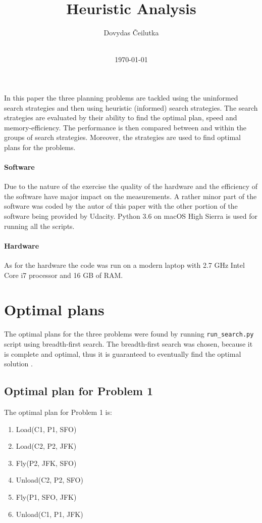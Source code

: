 \documentclass[11pt]{article}
\title{\vspace{-2.0cm}\textbf{Heuristic Analysis}}
\author{Dovydas Čeilutka\\\\}
\date{\today}
\begin{document}
\maketitle

In this paper the three planning problems are tackled using the uninformed search strategies and then using heuristic (informed) search strategies. The search strategies are evaluated by their ability to find the optimal plan, speed and memory-efficiency. The performance is then compared between and within the groups of search strategies. Moreover, the strategies are used to find optimal plans for the problems.

\paragraph{Software}

Due to the nature of the exercise the quality of the hardware and the efficiency of the software have major impact on the measurements. A rather minor part of the software was coded by the autor of this paper with the other portion of the software being provided by Udacity. Python 3.6 on macOS High Sierra is used for running all the scripts.

\paragraph{Hardware}

As for the hardware the code was run on a modern laptop with 2.7 GHz Intel Core i7 processor and 16 GB of RAM.

\section{Optimal plans}

The optimal plans for the three problems were found by running \texttt{run_search.py} script using breadth-first search. The breadth-first search was chosen, because it is complete and optimal, thus it is guaranteed to eventually find the optimal solution \autocite{russell2010artificial}.

\subsection{Optimal plan for Problem 1}

The optimal plan for Problem 1 is:

\begin{enumerate}
  \item Load(C1, P1, SFO)
  \item Load(C2, P2, JFK)
  \item Fly(P2, JFK, SFO)
  \item Unload(C2, P2, SFO)
  \item Fly(P1, SFO, JFK)
  \item Unload(C1, P1, JFK)
\end{enumerate}
\end{document}
